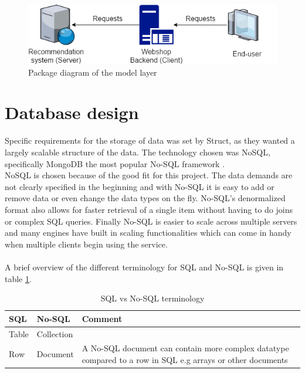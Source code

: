 \begin{figure}
	\centering
	\includegraphics[width=.8\linewidth]{Figures/ClientServer.png}
	\caption{Package diagram of the model layer}
	\label{fig:ClientServer}
\end{figure}

\section{Database design}
Specific requirements for the storage of data was set by Struct, as they wanted a largely scalable structure of the data. The technology chosen was \gls{NoSQL}, specifically \gls{MongoDB} the most popular No-SQL framework \cite{DBRankings}. \\
\gls{NoSQL} is chosen because of the good fit for this project. The data demands are not clearly specified in the beginning and with No-SQL it is easy to add or remove data or even change the data types on the fly. No-SQL's denormalized format also allows for faster retrieval of a single item without having to do joins or complex SQL queries. Finally No-SQL is easier to scale across multiple servers and many engines have built in scaling functionalities \cite{SQLvsNOSQL} which can come in handy when multiple clients begin using the service. \\\\

A brief overview of the different terminology for SQL and No-SQL is given in table \ref{sqlvsnosql_table}.
\begin{table}[H]
	\centering
	\caption{SQL vs No-SQL terminology}
	\label{sqlvsnosql_table}
	\begin{tabular}{|l|l|p{8cm}|}
		\hline
		\textbf{SQL}   & \textbf{No-SQL}     & \textbf{Comment}                                                                                                    \\ \hline
		Table & Collection &                                                                                                            \\ \hline
		Row   & Document   & A No-SQL document can contain more complex datatype compared to a row in SQL e.g arrays or other documents \\
		\hline
	\end{tabular}
\end{table}

